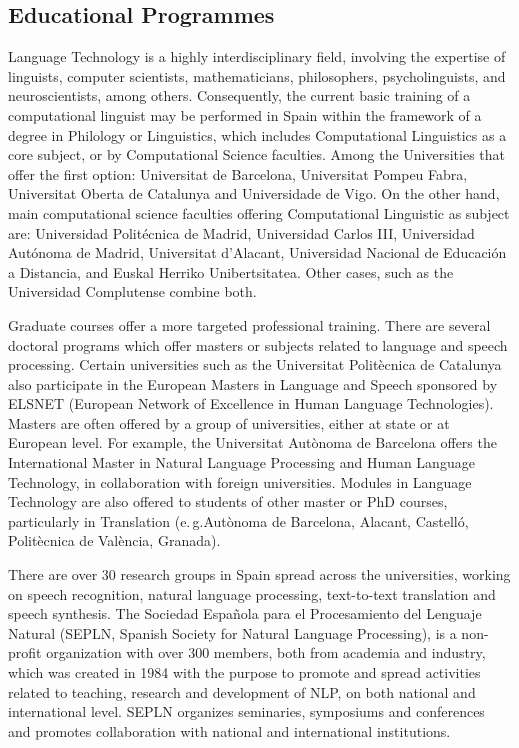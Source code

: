 \begin{multicols}{2}
\subsection{Educational Programmes}

Language Technology is a highly interdisciplinary field, involving the expertise of linguists, computer scientists, mathematicians, philosophers, psycholinguists, and neuroscientists, among others. Consequently, the current basic training of a computational linguist may be performed in Spain within the framework of a degree in Philology or Linguistics, which includes Computational Linguistics as a core subject, or by Computational Science faculties. Among the Universities that offer the first option: Universitat de Barcelona, Universitat Pompeu Fabra, Universitat Oberta de Catalunya and Universidade de Vigo. On the other hand, main computational science faculties offering Computational Linguistic as subject are: Universidad Politécnica de Madrid, Universidad Carlos III, Universidad Autónoma de Madrid, Universitat d’Alacant, Universidad Nacional de Educación a Distancia, and Euskal Herriko Unibertsitatea. Other cases, such as the Universidad Complutense combine both.

Graduate courses offer a more targeted professional training. There are several doctoral programs which offer masters or subjects related to language and speech processing. Certain universities such as the Universitat Politècnica de Catalunya also participate in the European Masters in Language and Speech sponsored by ELSNET (European Network of Excellence in Human Language Technologies). Masters are often offered by a group of universities, either at state or at European level. For example, the Universitat Autònoma de Barcelona offers the International Master in Natural Language Processing and Human Language Technology, in collaboration with foreign universities. Modules in Language Technology are also offered to students of other master or PhD courses, particularly in Translation (e.\,g.Autònoma de Barcelona, Alacant, Castelló, Politècnica de València, Granada).


There are over 30 research groups in Spain spread across the universities, working on speech recognition, natural language processing, text-to-text translation and speech synthesis. The Sociedad Española para el Procesamiento del Lenguaje Natural (SEPLN, Spanish Society for Natural Language Processing), is a non-profit organization with over 300 members, both from academia and industry, which was created in 1984 with the purpose to promote and spread activities related to teaching, research and development of NLP, on both national and international level. SEPLN organizes seminaries, symposiums and conferences and promotes collaboration with national and international institutions.


\end{multicols}
